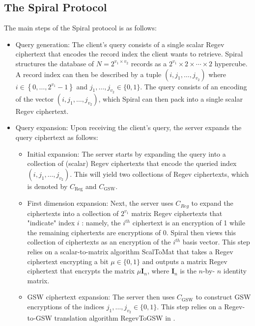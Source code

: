 \subsection{The Spiral Protocol}

The main steps of the Spiral protocol is as follows:

\begin{itemize}
    \item Query generation: The client's query consists of a single scalar Regev
    ciphertext that encodes the record index the client wants to retrieve. Spiral
    structures the database of $N=2^{v_{1} \times v_{2}}$ records as a $2^{v_{1}} \times 2
    \times \cdots \times 2$ hypercube. A record index can then be described by a tuple
    $\left(i, j_{1}, \ldots, j_{v_{2}}\right)$ where $i \in\left\{0, \ldots,
    2^{v_{1}}-1\right\}$ and $j_{1}, \ldots, j_{v_{2}} \in\{0,1\}$. The query consists of
    an encoding of the vector $\left(i, j_{1}, \ldots, j_{v_{2}}\right)$, which Spiral can
    then pack into a single scalar Regev ciphertext.

    \item Query expansion: Upon receiving the client's query, the server expands the query
    ciphertext as follows:

    \begin{itemize}
        \item Initial expansion: The server starts by expanding the query into a
        collection of (scalar) Regev ciphertexts that encode the queried index $\left(i,
        j_{1}, \ldots, j_{v_{2}}\right)$. This will yield two collections of Regev
        ciphertexts, which is denoted by $C_{\mathrm{Reg}}$ and $C_{\mathrm{GSW}}$.

        \item First dimension expansion: Next, the server uses $C_{Reg}$ to expand the
        ciphertexts into a collection of $2^{v_{1}}$ matrix Regev ciphertexts that
        "indicate" index $i$ : namely, the $i^{th}$ ciphertext is an encryption of 1 while
        the remaining ciphertexts are encryptions of 0. Spiral then views this collection
        of ciphertexts as an encryption of the $i^{th}$ basis vector. This step relies on
        a scalar-to-matrix algorithm ScalToMat that takes a Regev ciphertext encrypting a
        bit $\mu \in\{0,1\}$ and outputs a matrix Regev ciphertext that encrypts the
        matrix $\mu \mathbf{I}_{n}$, where $\mathbf{I}_{n}$ is the $n$-by- $n$ identity
        matrix.

        \item GSW ciphertext expansion: The server then uses $C_{\mathrm{GSW}}$ to
        construct GSW encryptions of the indices $j_{1}, \ldots, j_{v_{2}} \in\{0,1\}$.
        This step relies on a Regev-to-GSW translation algorithm RegevToGSW in \cite{1}.
    \end{itemize}


\end{itemize}
